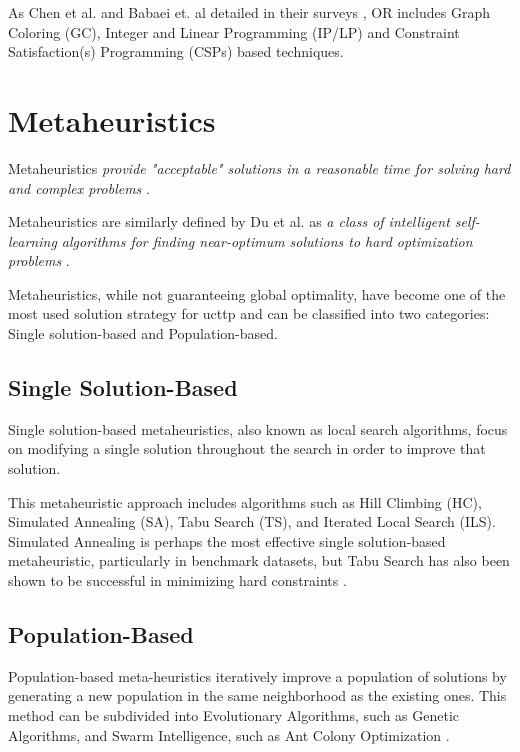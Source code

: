 As Chen et al. and  Babaei et. al detailed in their surveys \cite{babaei_survey_2015, chen_survey_2021}, OR includes Graph Coloring (GC), Integer and Linear Programming (IP/LP) and Constraint Satisfaction(s) Programming (CSPs) based techniques.

\section{Metaheuristics}

Metaheuristics \textit{provide "acceptable" solutions in a reasonable time for solving hard and complex problems} \cite{talbi2009metaheuristics}. 

Metaheuristics are similarly defined by Du et al. as \textit{a class of intelligent self-learning algorithms for finding near-optimum solutions to hard optimization problems} \cite{du2016search}.

Metaheuristics, while not guaranteeing global optimality, have become one of the most used solution strategy for \ac{ucttp} and can be classified into two categories: Single solution-based and Population-based.

\subsection{Single Solution-Based}

Single solution-based metaheuristics, also known as local search algorithms, focus on modifying a single solution throughout the search in order to improve that solution. 

This metaheuristic approach includes algorithms such as Hill Climbing (HC), Simulated Annealing (SA), Tabu Search (TS), and Iterated Local Search (ILS). Simulated Annealing is perhaps the most effective single solution-based metaheuristic, particularly in benchmark datasets, but Tabu Search has also been shown to be successful in minimizing hard constraints \cite{abdipoor_meta-heuristic_2023}.

\subsection{Population-Based}

Population-based meta-heuristics iteratively improve a population of solutions by generating a new population in the same neighborhood as the existing ones. This method can be subdivided into Evolutionary Algorithms, such as Genetic Algorithms, and Swarm Intelligence, such as Ant Colony Optimization \cite{abdipoor_meta-heuristic_2023,du2016search}.

